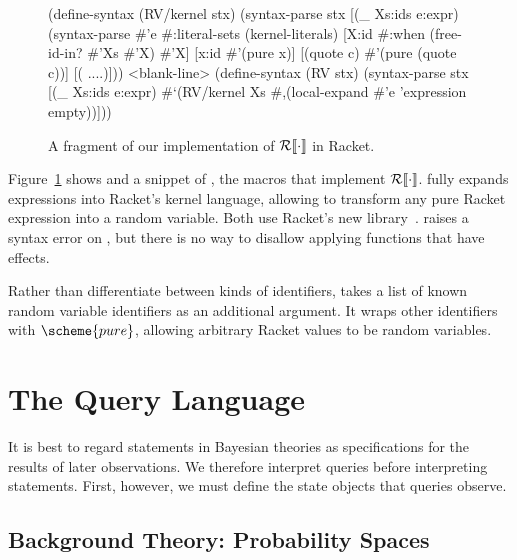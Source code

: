 \begin{figure}[tb]
\begin{schemedisplay}
(define-syntax (RV/kernel stx)
  (syntax-parse stx
    [(_ Xs:ids e:expr)
     (syntax-parse #'e #:literal-sets (kernel-literals)
       [X:id  #:when (free-id-in? #'Xs #'X)  #'X]
       [x:id  #'(pure x)]
       [(quote c)  #'(pure (quote c))]
       [(%
       ....)]))
<blank-line>
(define-syntax (RV stx)
  (syntax-parse stx
    [(_ Xs:ids e:expr)
     #`(RV/kernel Xs #,(local-expand #'e 'expression empty))]))
\end{schemedisplay}
\vspace{-\belowcodeskip}  %
\hrulefill
\caption[Implementation of $\RV{\cdot}$]{A fragment of our implementation of $\RV{\cdot}$ in Racket.}
\label{fig:rv-impl}
\end{figure}

Figure~\ref{fig:rv-impl} shows  and a snippet of , the macros that implement $\RV{\cdot}$.  fully expands expressions into Racket's kernel language, allowing  to transform any pure Racket expression into a random variable. Both use Racket's new  library~\cite{cit:culpepper-2010diss}.  raises a syntax error on , but there is no way to disallow applying functions that have effects.

Rather than differentiate between kinds of identifiers,  takes a list of known random variable identifiers as an additional argument. It wraps other identifiers with $\scheme{pure}$, allowing arbitrary Racket values to be random variables.

\section{The Query Language}
\label{sec:prob-dist}

It is best to regard statements in Bayesian theories as specifications for the results of later observations. We therefore interpret queries before interpreting statements. First, however, we must define the state objects that queries observe.

\subsection{Background Theory: Probability Spaces}

